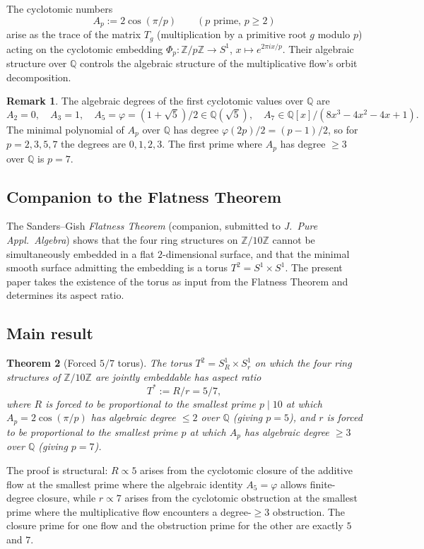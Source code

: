 \documentclass[11pt,reqno]{amsart}
\theoremstyle{plain}
\newtheorem{theorem}{Theorem}
\theoremstyle{definition}
\newtheorem{remark}[theorem]{Remark}
\newcommand{\Z}{\mathbb{Z}}
\newcommand{\Q}{\mathbb{Q}}
\newcommand{\Tstar}{T^{*}}
\begin{document}
The cyclotomic numbers
\[
A_p := 2 \cos(\pi/p) \qquad (p \text{ prime}, \, p \geq 2)
\]
arise as the trace of the matrix $T_g$ (multiplication by a primitive root $g$ modulo $p$) acting on the cyclotomic embedding $\Phi_p \colon \Z/p\Z \to S^1$, $x \mapsto e^{2\pi i x/p}$. Their algebraic structure over $\Q$ controls the algebraic structure of the multiplicative flow's orbit decomposition.

\begin{remark}
The algebraic degrees of the first cyclotomic values over $\Q$ are
\[
A_2 = 0,\quad A_3 = 1,\quad A_5 = \varphi = (1+\sqrt 5)/2 \in \Q(\sqrt 5),\quad A_7 \in \Q[x]/(8x^3 - 4 x^2 - 4 x + 1).
\]
The minimal polynomial of $A_p$ over $\Q$ has degree $\varphi(2p)/2 = (p-1)/2$, so for $p = 2,3,5,7$ the degrees are $0, 1, 2, 3$. The first prime where $A_p$ has degree $\geq 3$ over $\Q$ is $p = 7$.
\end{remark}

\subsection{Companion to the Flatness Theorem}

The Sanders--Gish \emph{Flatness Theorem} (companion, submitted to \emph{J.\ Pure Appl.\ Algebra}) shows that the four ring structures on $\Z/10\Z$ cannot be simultaneously embedded in a flat $2$-dimensional surface, and that the minimal smooth surface admitting the embedding is a torus $T^2 = S^1 \times S^1$. The present paper takes the existence of the torus as input from the Flatness Theorem and determines its aspect ratio.

\subsection{Main result}

\begin{theorem}[Forced $5/7$ torus] \label{thm:forced57}
The torus $T^2 = S^1_R \times S^1_r$ on which the four ring structures of $\Z/10\Z$ are jointly embeddable has aspect ratio
\[
\Tstar := R/r = 5/7,
\]
where $R$ is forced to be proportional to the smallest prime $p \mid 10$ at which $A_p = 2\cos(\pi/p)$ has algebraic degree $\leq 2$ over $\Q$ (giving $p = 5$), and $r$ is forced to be proportional to the smallest prime $p$ at which $A_p$ has algebraic degree $\geq 3$ over $\Q$ (giving $p = 7$).
\end{theorem}

The proof is structural: $R \propto 5$ arises from the cyclotomic closure of the additive flow at the smallest prime where the algebraic identity $A_5 = \varphi$ allows finite-degree closure, while $r \propto 7$ arises from the cyclotomic obstruction at the smallest prime where the multiplicative flow encounters a degree-$\geq 3$ obstruction. The closure prime for one flow and the obstruction prime for the other are exactly $5$ and $7$.
\end{document}
